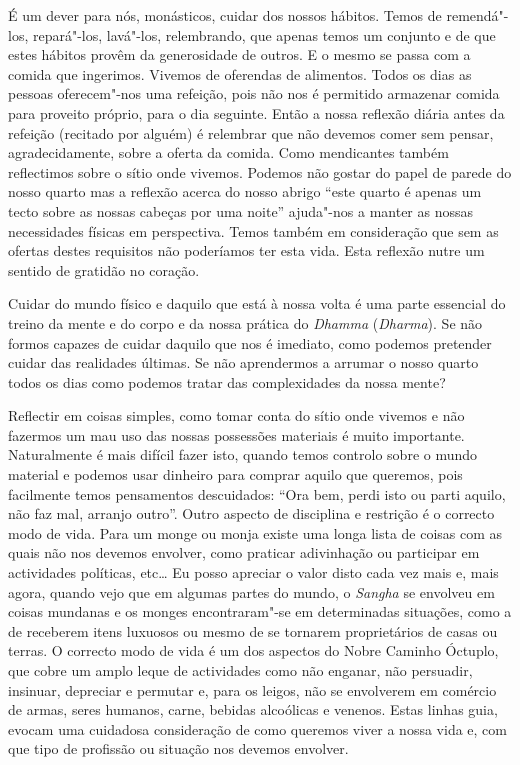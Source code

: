 É um dever para nós, monásticos, cuidar dos nossos hábitos. Temos de
remendá"-los, repará"-los, lavá"-los, relembrando, que apenas temos um
conjunto e de que estes hábitos provêm da generosidade de outros. E o
mesmo se passa com a comida que ingerimos. Vivemos de oferendas de
alimentos. Todos os dias as pessoas oferecem"-nos uma refeição, pois não
nos é permitido armazenar comida para proveito próprio, para o dia
seguinte. Então a nossa reflexão diária antes da refeição (recitado por
alguém) é relembrar que não devemos comer sem pensar, agradecidamente,
sobre a oferta da comida. Como mendicantes também reflectimos sobre o
sítio onde vivemos. Podemos não gostar do papel de parede do nosso
quarto mas a reflexão acerca do nosso abrigo ``este quarto é apenas um
tecto sobre as nossas cabeças por uma noite'' ajuda"-nos a manter as
nossas necessidades físicas em perspectiva. Temos também em consideração
que sem as ofertas destes requisitos não poderíamos ter esta vida. Esta
reflexão nutre um sentido de gratidão no coração.

Cuidar do mundo físico e daquilo que está à nossa volta é uma parte
essencial do treino da mente e do corpo e da nossa prática do
\emph{Dhamma} (\emph{Dharma}). Se não formos capazes de cuidar daquilo
que nos é imediato, como podemos pretender cuidar das realidades
últimas. Se não aprendermos a arrumar o nosso quarto todos os dias como
podemos tratar das complexidades da nossa mente?

Reflectir em coisas simples, como tomar conta do sítio onde vivemos e
não fazermos um mau uso das nossas possessões materiais é muito
importante. Naturalmente é mais difícil fazer isto, quando temos
controlo sobre o mundo material e podemos usar dinheiro para comprar
aquilo que queremos, pois facilmente temos pensamentos descuidados: ``Ora
bem, perdi isto ou parti aquilo, não faz mal, arranjo outro''. Outro
aspecto de disciplina e restrição é o correcto modo de vida. Para um
monge ou monja existe uma longa lista de coisas com as quais não nos
devemos envolver, como praticar adivinhação ou participar em actividades
políticas, etc\ldots{} Eu posso apreciar o valor disto cada vez mais e, mais
agora, quando vejo que em algumas partes do mundo, o \emph{Sangha} se
envolveu em coisas mundanas e os monges encontraram"-se em determinadas
situações, como a de receberem itens luxuosos ou mesmo de se tornarem
proprietários de casas ou terras. O correcto modo de vida é um dos
aspectos do Nobre Caminho Óctuplo, que cobre um amplo leque de
actividades como não enganar, não persuadir, insinuar, depreciar e
permutar e, para os leigos, não se envolverem em comércio de armas,
seres humanos, carne, bebidas alcoólicas e venenos. Estas linhas guia,
evocam uma cuidadosa consideração de como queremos viver a nossa vida e,
com que tipo de profissão ou situação nos devemos envolver.

